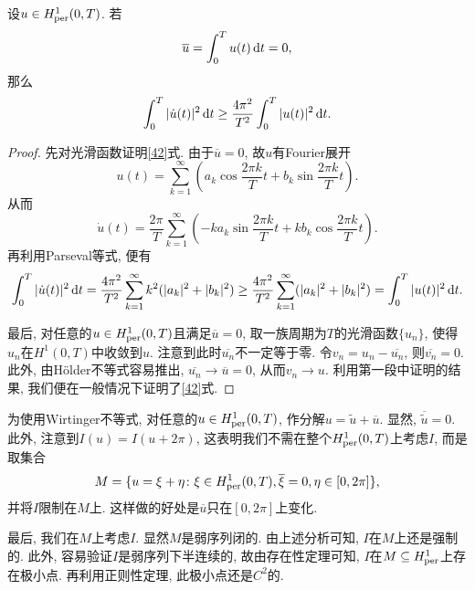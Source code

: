 \begin{lemma}[Wirtinger不等式]
    设$u \in H_{{\rm per}}^1(0, T)$. 若 
    \begin{equation*}
        \overline{u} = \int_0^Tu(t) \,{\rm d}t = 0,
    \end{equation*}
    那么 
    \begin{equation}\label{42}
        \int_0^T|\dot u(t)|^2 \,{\rm d}t \geq \frac{4\pi^2}{T^2}\int_0^T|u(t)|^2 \,{\rm d}t.
    \end{equation}
    \begin{proof}
        先对光滑函数证明\eqref{42}式. 由于$\overline{u} = 0$, 故$u$有Fourier展开 
        \begin{equation*}
            u(t) = \sum_{k = 1}^{\infty}\left(a_k\cos\frac{2\pi k}{T}t + b_k\sin\frac{2\pi k}{T}t\right).
        \end{equation*}
        从而 
        \begin{equation*}
            \dot u(t) = \frac{2\pi}{T}\sum_{k = 1}^{\infty}\left(-ka_k\sin\frac{2\pi k}{T}t + kb_k\cos\frac{2\pi k}{T}t\right).
        \end{equation*}
        再利用Parseval等式, 便有 
        \begin{align*}
            \int_0^T|\dot u(t)|^2 \,{\rm d}t = \frac{4\pi^2}{T^2}\sum_{k = 1}^{\infty}k^2(|a_k|^2 + |b_k|^2) \geq \frac{4\pi^2}{T^2}\sum_{k = 1}^{\infty}(|a_k|^2 + |b_k|^2) = \int_0^T|u(t)|^2 \,{\rm d}t.
        \end{align*}

        最后, 对任意的$u \in H_{{\rm per}}^1(0, T)$且满足$\overline{u} = 0$, 取一族周期为$T$的光滑函数$\{u_n\}$, 使得$u_n$在$H^1(0, T)$中收敛到$u$.
        注意到此时$\overline{u_n}$不一定等于零. 令$v_n = u_n - \overline{u_n}$, 则$\overline{v_n} = 0$.
        此外, 由H\"older不等式容易推出, $\overline{u_n} \rightarrow \overline{u} = 0$, 从而$v_n \rightarrow u$.
        利用第一段中证明的结果, 我们便在一般情况下证明了\eqref{42}式.
    \end{proof}
\end{lemma}

为使用Wirtinger不等式, 对任意的$u \in H_{{\rm per}}^1(0, T)$, 作分解$u = \widetilde{u} + \overline{u}$.
显然, $\overline{\widetilde{u}} = 0$. 此外, 注意到$I(u) = I(u + 2\pi)$, 这表明我们不需在整个$H_{{\rm per}}^1(0, T)$上考虑$I$, 而是取集合 
\begin{equation*}
    M = \{u = \xi + \eta\colon \xi \in H_{{\rm per}}^1(0, T), \overline{\xi} = 0, \eta \in [0, 2\pi]\},
\end{equation*}
并将$I$限制在$M$上. 这样做的好处是$\overline{u}$只在$[0, 2\pi]$上变化.

最后, 我们在$M$上考虑$I$. 显然$M$是弱序列闭的. 由上述分析可知, $I$在$M$上还是强制的.
此外, 容易验证$I$是弱序列下半连续的, 故由存在性定理可知, $I$在$M \subseteq H_{{\rm per}}^1$上存在极小点.
再利用正则性定理, 此极小点还是$C^2$的.
